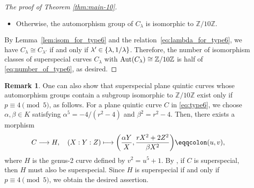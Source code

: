 \documentclass{article}
\theoremstyle{definition}
\newtheorem{Rmk}[Def]{Remark}
\begin{document}
\begin{proof}[The proof of Theorem \ref{thm:main-10}]
\begin{itemize}
    \item Otherwise, the automorphism group of $C_\lambda$ is isomorphic to $\mathbb{Z}/10\mathbb{Z}$.\vspace{-0.8mm}
\end{itemize}
By Lemma~\ref{lem:isom_for_type6} and the relation~\eqref{eq:lambda_for_type6}, we have $C_\lambda \cong C_{\lambda'}$\hspace{-0.1mm} if and only if $\lambda' \hspace{-0.1mm}\in\hspace{-0.1mm} \{\lambda,1/\lambda\}$.
Therefore, the number of isomorphism classes of superspecial curves $C_\lambda$ with ${\rm Aut}(C_\lambda) \cong \mathbb{Z}/10\mathbb{Z}$ is half of \eqref{eq:number_of_type6}, as desired.\vspace{-1.1mm}
\end{proof}
\begin{Rmk}
One can also show that superspecial plane quintic curves whose automorphism groups contain a subgroup isomorphic to $\mathbb{Z}/10\mathbb{Z}$ exist only if $p \equiv 4 \pmod{5}$, as follows.
For a plane quintic curve $C$ in \eqref{eq:type6}, we choose $\alpha,\beta \in K$ satisfying $\alpha^5 = -4/(r^2-4)$ and $\beta^2 = r^2-4$.
Then, there exists a morphism\vspace{-0.9mm}
\[
    C \longrightarrow H, \quad (X:Y:Z) \longmapsto \biggl(\frac{\alpha Y}{X},\frac{rX^2+2Z^2}{\beta X^2}\biggr) \eqqcolon (u,v),\vspace{-0.3mm}
\]
where $H$ is the genus-2 curve defined by $v^2 = u^5+1$.
By \cite[Corollary 2.8]{KNT}, if $C$ is superspecial, then $H$ must also be superspecial.
Since $H$ is superspecial if and only if $p \equiv 4 \pmod{5}$, we obtain the desired assertion.
\end{Rmk}

\newpage
\end{document}

